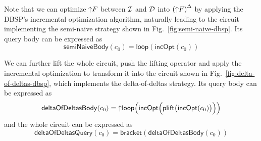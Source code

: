 Note that we can optimize ${\uparrow}F$ between $\mathcal{I}$ and $\mathcal{D}$ into ${({\uparrow}F)}^{\Delta}$ by applying the DBSP's incremental optimization algorithm, naturally leading to the circuit implementing the semi-naive strategy shown in Fig.~\ref{fig:semi-naive-dbsp}. Its query body can be expressed as
\begin{equation}\label{eq:semi-naive-body}
    \mathsf{semiNaiveBody}(c_0) = \mathsf{loop}(\mathsf{incOpt}(c_0))
\end{equation}

We can further lift the whole circuit, push the lifting operator and apply the incremental optimization to transform it into the circuit shown in Fig.~\ref{fig:delta-of-deltas-dbsp}, which implements the delta-of-deltas strategy.
Its query body can be expressed as
\begin{equation}\label{eq:delta-of-deltas-body}
    \mathsf{deltaOfDeltasBody}(c_0) = \mathsf{{\uparrow}loop}\Bigl(\mathsf{incOpt} \Bigl(\mathsf{plift} \bigl(\mathsf{incOpt}(c_0)\bigr) \Bigr) \Bigr)
\end{equation}
and the whole circuit can be expressed as
\begin{equation}\label{eq:opt-datalog-query}
    \mathsf{deltaOfDeltasQuery}(c_0) = \mathsf{bracket}(\mathsf{deltaOfDeltasBody}(c_0))
\end{equation}
